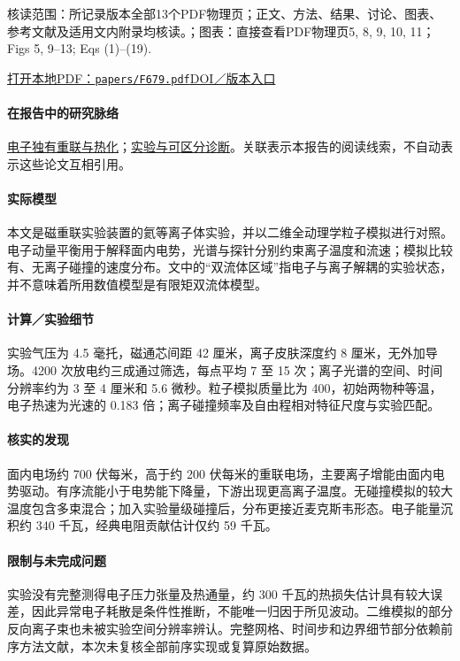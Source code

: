 \textsf{核读范围：}所记录版本全部13个PDF物理页；正文、方法、结果、讨论、图表、参考文献及适用文内附录均核读。；\textsf{图表：}直接查看PDF物理页5, 8, 9, 10, 11；Figs 5,  9–13;  Eqs (1)–(19).

\href{run:papers/F679.pdf}{打开本地PDF：\texttt{papers/F679.pdf}}\quad\href{https://doi.org/10.1063/1.4874331}{DOI／版本入口}

\paragraph{在报告中的研究脉络}\hyperref[story:energy]{电子独有重联与热化}；\hyperref[story:diagnostic]{实验与可区分诊断}。关联表示本报告的阅读线索，不自动表示这些论文互相引用。

\paragraph{实际模型}本文是磁重联实验装置的氦等离子体实验，并以二维全动理学粒子模拟进行对照。电子动量平衡用于解释面内电势，光谱与探针分别约束离子温度和流速；模拟比较有、无离子碰撞的速度分布。文中的“双流体区域”指电子与离子解耦的实验状态，并不意味着所用数值模型是有限矩双流体模型。

\paragraph{计算／实验细节}实验气压为 4.5 毫托，磁通芯间距 42 厘米，离子皮肤深度约 8 厘米，无外加导场。4200 次放电约三成通过筛选，每点平均 7 至 15 次；离子光谱的空间、时间分辨率约为 3 至 4 厘米和 5.6 微秒。粒子模拟质量比为 400，初始两物种等温，电子热速为光速的 0.183 倍；离子碰撞频率及自由程相对特征尺度与实验匹配。

\paragraph{核实的发现}面内电场约 700 伏每米，高于约 200 伏每米的重联电场，主要离子增能由面内电势驱动。有序流能小于电势能下降量，下游出现更高离子温度。无碰撞模拟的较大温度包含多束混合；加入实验量级碰撞后，分布更接近麦克斯韦形态。电子能量沉积约 340 千瓦，经典电阻贡献估计仅约 59 千瓦。

\paragraph{限制与未完成问题}实验没有完整测得电子压力张量及热通量，约 300 千瓦的热损失估计具有较大误差，因此异常电子耗散是条件性推断，不能唯一归因于所见波动。二维模拟的部分反向离子束也未被实验空间分辨率辨认。完整网格、时间步和边界细节部分依赖前序方法文献，本次未复核全部前序实现或复算原始数据。

